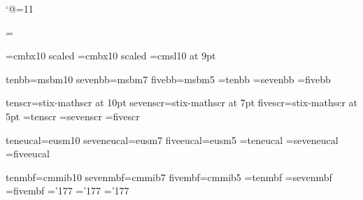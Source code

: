 \catcode`@=11


\parskip=\smallskipamount
\parindent=0pt



\let\ea=\expandafter
\let\:=\colon
\let\dsty=\displaystyle
\let\tsty=\textstyle
\let\ssty=\scriptstyle
\let\sssty=\scriptscriptstyle



\font\ftitle=cmbx10 scaled 
\font\fprobtitle=cmbx10 scaled 
\font\fprobdesc=cmsl10 at 9pt

\def\loadfont#1#2#3#4#5{%
	\ea\font\csname ten#1\endcsname=#2
	\ea\font\csname seven#1\endcsname=#3
	\ea\font\csname five#1\endcsname=#4
	\ea\textfont\ea#5\ea=\csname ten#1\endcsname
	\ea\scriptfont\ea#5\ea=\csname seven#1\endcsname
	\ea\scriptscriptfont\ea#5\ea=\csname five#1\endcsname
	\ea\def\csname #1\endcsname{\fam#5}}

\newfam\bbfam
\loadfont{bb}{msbm10}{msbm7}{msbm5}\bbfam

\newfam\scrfam
\loadfont{scr}{stix-mathscr at 10pt}{stix-mathscr at 7pt}%
	{stix-mathscr at 5pt}\scrfam

\newfam\eucalfam
\loadfont{eucal}{eusm10}{eusm7}{eusm5}\eucalfam

\newfam\mbffam
\loadfont{mbf}{cmmib10}{cmmib7}{cmmib5}\mbffam
\skewchar\tenmbf='177
\skewchar\sevenmbf='177
\skewchar\fivembf='177



\def\1#1#2{#1} %
\def\2#1#2{#2} %

\def\hugeskip{\vskip 24pt plus 8pt\relax}

\def\lxor{\oplus}
\def\limp{\rightarrow}
\def\Limp{\Rightarrow}
\def\liff{\leftrightarrow}
\def\Liff{\Leftrightarrow}

\def\N{{\bb N}}
\def\Z{{\bb Z}}
\def\Q{{\bb Q}}
\def\R{{\bb R}}
\def\powset{{\scr P}}

\def\bigo{{\eucal O}}
\def\littleo{{\mit o}}
\def\bigomega{{\rm \Omega}}
\def\littleomega{\omega}
\def\bigtheta{{\rm \Theta}}

\def\ihat{{\bf\mathaccent"705E \mathchar"7010}}
\def\jhat{{\bf\mathaccent"705E \mathchar"7011}}
\def\khat{{\bf\mathaccent"705E k}}

